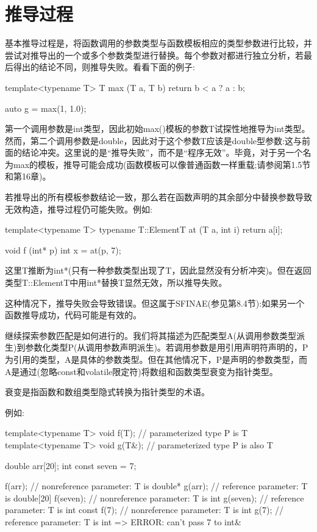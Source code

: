 \section{推导过程}
基本推导过程是，将函数调用的参数类型与函数模板相应的类型参数进行比较，并尝试对推导出的一个或多个参数类型进行替换。每个参数对都进行独立分析，若最后得出的结论不同，则推导失败。看看下面的例子:
 
\begin{cpp}
template<typename T>
T max (T a, T b)
{
	return b < a ? a : b;
}

auto g = max(1, 1.0);
\end{cpp} 
 
第一个调用参数是int类型，因此初始max()模板的参数T试探性地推导为int类型。然而，第二个调用参数是double，因此对于这个参数T应该是double型参数:这与前面的结论冲突。这里说的是“推导失败”，而不是“程序无效”。毕竟，对于另一个名为max的模板，推导可能会成功(函数模板可以像普通函数一样重载;请参阅第1.5节和第16章)。
 
若推导出的所有模板参数结论一致，那么若在函数声明的其余部分中替换参数导致无效构造，推导过程仍可能失败。例如:

\begin{cpp}
template<typename T>
typename T::ElementT at (T a, int i)
{
	return a[i];
}

void f (int* p)
{
	int x = at(p, 7);
}
\end{cpp} 

这里T推断为int*(只有一种参数类型出现了T，因此显然没有分析冲突)。但在返回类型T::ElementT中用int*替换T显然无效，所以推导失败。

\begin{notice}
这种情况下，推导失败会导致错误。但这属于SFINAE(参见第8.4节):如果另一个函数推导成功，代码可能是有效的。
\end{notice}

继续探索参数匹配是如何进行的。我们将其描述为匹配类型A(从调用参数类型派生)到参数化类型P(从调用参数声明派生)。若调用参数是用引用声明符声明的，P为引用的类型，A是具体的参数类型。但在其他情况下，P是声明的参数类型，而A是通过(忽略const和volatile限定符)将数组和函数类型衰变为指针类型。

\begin{notice}
衰变是指函数和数组类型隐式转换为指针类型的术语。
\end{notice}

例如:

\begin{cpp}
template<typename T> void f(T); // parameterized type P is T
template<typename T> void g(T&); // parameterized type P is also T

double arr[20];
int const seven = 7;

f(arr); // nonreference parameter: T is double*
g(arr); // reference parameter: T is double[20]
f(seven); // nonreference parameter: T is int
g(seven); // reference parameter: T is int const
f(7); // nonreference parameter: T is int
g(7); // reference parameter: T is int => ERROR: can't pass 7 to int&
\end{cpp} 

